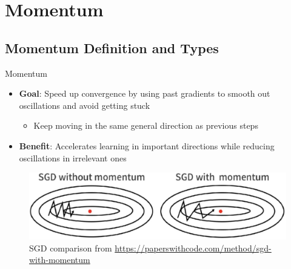 \documentclass[serif, aspectratio=169]{beamer}
\begin{document}
\section{Momentum}
\subsection{Momentum Definition and Types}
\begin{frame}{Momentum}
    \begin{minipage}{0.5\textwidth}
        \begin{itemize}
            \item \textbf{Goal}: Speed up convergence by using past gradients to smooth out oscillations and avoid getting stuck
            \begin{itemize}
                \item Keep moving in the same general direction as previous steps
            \end{itemize}
            \item \textbf{Benefit}: Accelerates learning in important directions while reducing oscillations in irrelevant ones
        \end{itemize}
    \end{minipage}%
    \begin{minipage}{0.5\linewidth}
    \begin{figure}[h]
        \centering
        \includegraphics[height=.25\textheight]{pic/momentum_paperswithcode.jpg}
        \caption{\footnotesize SGD comparison from \url{https://paperswithcode.com/method/sgd-with-momentum}}
    \end{figure}
    \end{minipage}
\end{frame}
\end{document}
